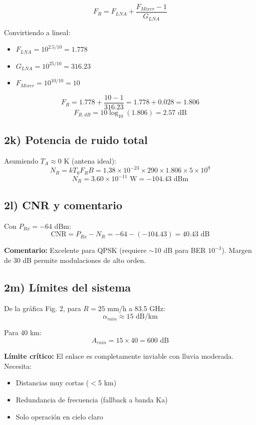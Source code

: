 \documentclass[a4paper,11pt]{article}
\begin{document}
$$F_R = F_{LNA} + \frac{F_{Mixer} - 1}{G_{LNA}}$$

Convirtiendo a lineal:
\begin{itemize}
    \item $F_{LNA} = 10^{2.5/10} = 1.778$
    \item $G_{LNA} = 10^{25/10} = 316.23$
    \item $F_{Mixer} = 10^{10/10} = 10$
\end{itemize}

$$F_R = 1.778 + \frac{10 - 1}{316.23} = 1.778 + 0.028 = 1.806$$
$$F_{R,dB} = 10\log_{10}(1.806) = 2.57 \text{ dB}$$

\subsection*{2k) Potencia de ruido total}

Asumiendo $T_A \approx 0$ K (antena ideal):
$$N_R = k T_0 F_R B = 1.38 \times 10^{-23} \times 290 \times 1.806 \times 5 \times 10^9$$
$$N_R = 3.60 \times 10^{-11} \text{ W} = -104.43 \text{ dBm}$$

\subsection*{2l) CNR y comentario}

Con $P_{Rx} = -64$ dBm:
$$\text{CNR} = P_{Rx} - N_R = -64 - (-104.43) = 40.43 \text{ dB}$$

\textbf{Comentario:} Excelente para QPSK (requiere $\sim$10 dB para BER $10^{-3}$). Margen de 30 dB permite modulaciones de alto orden.

\subsection*{2m) Límites del sistema}

De la gráfica Fig. 2, para $R = 25$ mm/h a 83.5 GHz:
$$\alpha_{rain} \approx 15 \text{ dB/km}$$

Para 40 km:
$$A_{rain} = 15 \times 40 = 600 \text{ dB}$$

\textbf{Límite crítico:} El enlace es completamente inviable con lluvia moderada. Necesita:
\begin{itemize}
    \item Distancias muy cortas ($<$5 km)
    \item Redundancia de frecuencia (fallback a banda Ka)
    \item Solo operación en cielo claro
\end{itemize}
\end{document}
